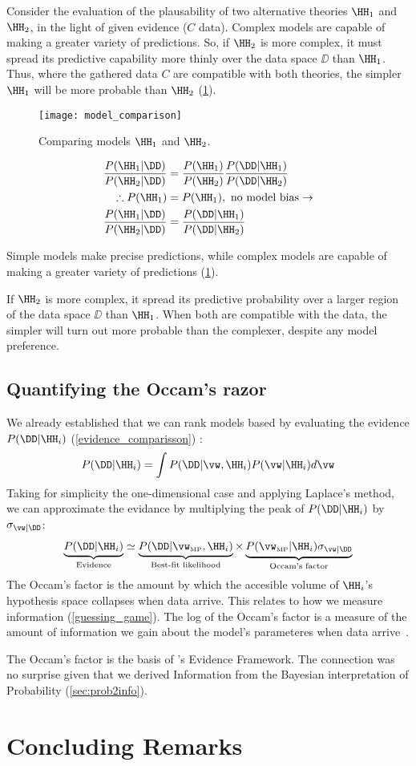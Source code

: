 Consider the evaluation of the plausability of two alternative theories $\HH_1$ and $\HH_2$, in the light of given evidence ($C$ data). Complex models are capable of making a greater variety of predictions. So, if $\HH_2$ is more complex, it must spread its predictive capability more thinly over the data space $\DD$ than $\HH_1$. Thus, where the gathered data $C$ are compatible with both theories, the simpler $\HH_1$ will be more probable than $\HH_2$ (\cref{modelcomparison}).
\begin{figure}[hbt!]
	\centering
	\texttt{[image: model\_comparison]}
	\caption{Comparing models $\HH_1$ and $\HH_2$.}\label{modelcomparison}
	\end{figure}
	\begin{align}
    \frac{P(\HH_1|\DD)}{P(\HH_2|\DD)}&=\frac{P(\HH_1)}{P(\HH_2)}\frac{P(\DD|\HH_1)}{P(\DD|\HH_2)}\\
    \therefore P(\HH_1)&=P(\HH_1),~\text{no model bias} \to  \nonumber\\
		\frac{P(\HH_1|\DD)}{P(\HH_2|\DD)}&=\frac{P(\DD|\HH_1)}{P(\DD|\HH_2)}\label{evidence_comparisson}
   \end{align}

	Simple models make precise predictions, while complex models are capable of making a greater variety of predictions (\cref{modelcomparison}).

	If $\HH_2$ is more complex, it spread its predictive probability over a larger region of the data space $\DD$ than $\HH_1$. When both are compatible with the data, the simpler will turn out more probable than the complexer, despite any model preference.
 \subsection{Quantifying the Occam's razor}
 We already established that we can rank models based by evaluating the evidence$P(\DD|\HH_i)$  (\eqref{evidence_comparisson}) :
 \begin{align}
	P(\DD|\HH_i) = \int P(\DD|\vw, \HH_i) P(\vw|\HH_i) d\vw \label{evidence_integral}
\end{align}
Taking for simplicity the one-dimensional case and applying Laplace's method, we can approximate the evidance by multiplying the peak of $P(\DD|\HH_i)$ by $\sigma_{\vw|\DD}$:
\begin{align}
	\underbrace{P(\DD|\HH_i)}_\text{Evidence} \simeq \underbrace{P(\DD|\vw_{\text{\tiny MP}}, \HH_i)}_\text{Best-fit likelihood} \times \underbrace{P(\vw_{\text{\tiny MP}}|\HH_i) \sigma_{\vw|\DD}}_\text{Occam's factor}
\end{align}
The Occam's factor is the amount by which the accesible volume of $\HH_i$'s hypothesis space collapses when data arrive. This relates to how we measure information (\cref{guessing_game}).
The log of the Occam's factor is a measure of the amount of information we gain about the model's parameteres when data arrive~\cite{mackay:2002}.

The Occam's factor is the basis of \citeauthor{mackay:2002}'s Evidence Framework. The connection was no surprise given that we derived Information from the Bayesian interpretation of Probability (\cref{sec:prob2info}).
\section{Concluding Remarks}
